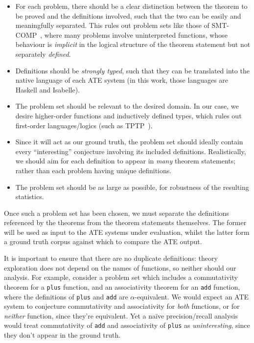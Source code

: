 \begin{itemize}
\item For each problem, there should be a clear distinction between the theorem
  to be proved and the definitions involved, such that the two can be easily and
  meaningfully separated. This rules out problem sets like those of
  SMT-COMP~\cite{barrett2005smt}, where many problems involve uninterpreted
  functions, whose behaviour is \emph{implicit} in the logical structure of the
  theorem statement but not separately \emph{defined}.
\item Definitions should be \emph{strongly typed}, such that they can be
  translated into the native language of each ATE system (in this work, those
  languages are Haskell and Isabelle).
\item The problem set should be relevant to the desired domain. In our case, we
  desire higher-order functions and inductively defined types, which rules out
  first-order languages/logics (such as TPTP~\cite{sutcliffe2009tptp}).
\item Since it will act as our ground truth, the problem set should ideally
  contain every ``interesting'' conjecture involving its included
  definitions. Realistically, we should aim for each definition to appear in
  \emph{many} theorem statements; rather than each problem having unique
  definitions.
\item The problem set should be as large as possible, for robustness of the
  resulting statistics.
\end{itemize}

Once such a problem set has been chosen, we must separate the definitions
referenced by the theorems from the theorem statements themselves. The former
will be used as input to the ATE systems under evaluation, whilst the latter
form a ground truth corpus against which to compare the ATE output.

It is important to ensure that there are no duplicate definitions: theory
exploration does not depend on the names of functions, so neither should our
analysis. For example, consider a problem set which includes a commutativity
theorem for a \texttt{plus} function, and an associativity theorem for an
\texttt{add} function, where the definitions of \texttt{plus} and \texttt{add}
are $\alpha$-equivalent. We would expect an ATE system to conjecture
commutativity and associativity for \emph{both} functions, or for \emph{neither}
function, since they're equivalent. Yet a na\"ive precision/recall analysis
would treat commutativity of \texttt{add} and associativity of \texttt{plus} as
\emph{uninteresting}, since they don't appear in the ground truth.

